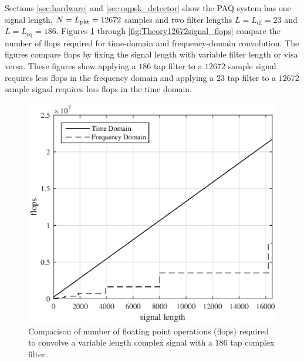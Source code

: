 Sections \ref{sec:hardware} and \ref{sec:oqpsk_detector} show the PAQ system has one signal length, $N = L_\text{pkt} = 12672$ samples and two filter lengths $L = L_\text{df} = 23$ and $L = L_\text{eq} = 186$.
Figures \ref{fig:Theory186Tap_flops} through \ref{fig:Theory12672signal_flops} compare the number of flops required for time-domain and frequency-domain convolution.
The figures compare flops by fixing the signal length with variable filter length or visa versa.
These figures show applying a $186$ tap filter to a $12672$ sample signal requires less flops in the frequency domain and
applying a $23$ tap filter to a $12672$ sample signal requires less flops in the time domain.
\begin{figure}
	\centering\includegraphics[width=5in]{figures/gpu_intro/Theory186Tap_flops.eps}
	\caption{Comparison of number of floating point operations (flops) required to convolve a variable length complex signal with a $186$ tap complex filter.}
	\label{fig:Theory186Tap_flops}
\end{figure}
